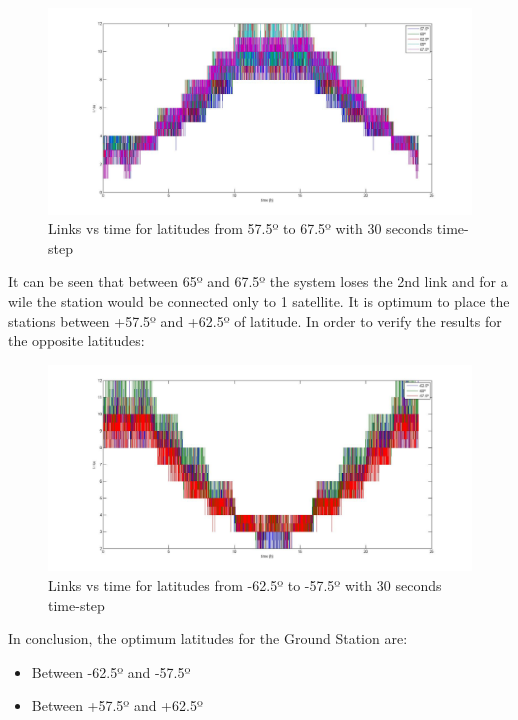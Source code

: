 \begin{figure}[H]
\begin{center}
\includegraphics[scale=0.30]{575_25_675_(30s)_lat.jpg}
\caption{Links vs time for latitudes from 57.5º to 67.5º with 30 seconds time-step}
\end{center}
\end{figure}
It can be seen that between 65º and 67.5º the system loses the 2nd link and for a wile the station would be connected only to 1 satellite. It is optimum to place the stations between +57.5º and +62.5º of latitude. In order to verify the results for the opposite latitudes:
\begin{figure}[H]
\begin{center}
\includegraphics[scale=0.30]{-625_-25_575_(30s)_lat.jpg}
\caption{Links vs time for latitudes from -62.5º to -57.5º with 30 seconds time-step}
\end{center}
\end{figure}
In conclusion, the optimum latitudes for the Ground Station are:
\begin{itemize}
\item Between -62.5º and -57.5º
\item Between +57.5º and +62.5º
\end{itemize}

